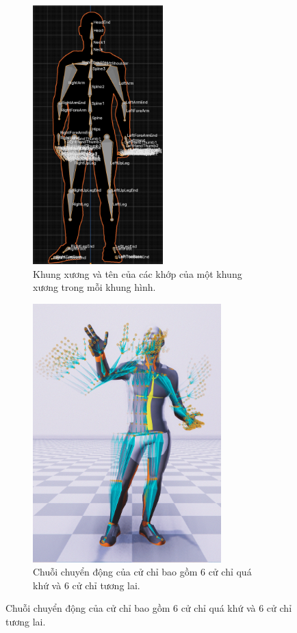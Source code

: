 \begin{figure}[H]
	\centering
	\begin{subfigure}{0.49\textwidth}
		\centering
		\includegraphics[height=10cm]{images/Skeleton.png}
		\caption{\small Khung xương và tên của các khớp của một khung xương trong mỗi khung hình.}
		\label{fig:Skeleton}
	\end{subfigure}
	\hfill
	\begin{subfigure}{0.49\textwidth}
		\centering
		\includegraphics[height=10cm]{images/MotionPastAndFuture.png}
		\caption{\small Chuỗi chuyển động của cử chỉ bao gồm 6 cử chỉ quá khứ và 6 cử chỉ tương lai.}
		\label{fig:MotionPastAndFuture}
	\end{subfigure}
\end{figure}

